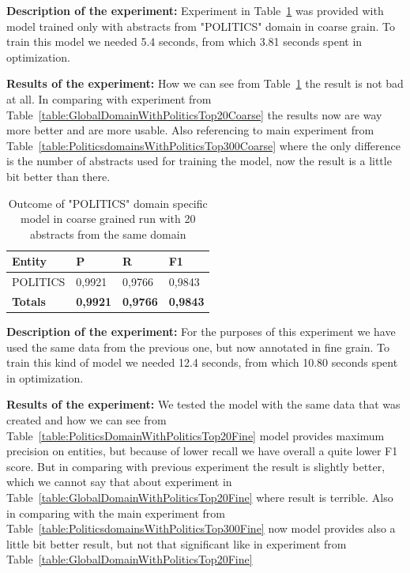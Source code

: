\documentclass[thesis=M,english]{FITthesis}[2018/05/30]
\begin{document}
\textbf{Description of the experiment:} Experiment in Table~\ref{table:PoliticsDomainWithPoliticsTop20Coarse} was provided with model trained only with abstracts from "POLITICS" domain in coarse grain. To train this model we needed 5.4 seconds, from which 3.81 seconds spent in optimization.

\textbf{Results of the experiment:} How we can see from Table~\ref{table:PoliticsDomainWithPoliticsTop20Coarse} the result is not bad at all. In comparing with experiment from Table~\ref{table:GlobalDomainWithPoliticsTop20Coarse} the results now are way more better and are more usable. Also referencing to main experiment from Table~\ref{table:PoliticsdomainsWithPoliticsTop300Coarse} where the only difference is the number of abstracts used for training the model, now the result is a little bit better than there.  
	
	\begin{table}[H]\centering
		\begin{tabular}{|l|l|l|l|}
			\hline {\textbf{Entity}} & {\textbf{P}} & {\textbf{R}} & {\textbf{F1}}\\\hline
				POLITICS & 0,9921 & 0,9766 & 0,9843\\\hline
				\textbf{Totals} & \textbf{0,9921} & \textbf{0,9766} & \textbf{0,9843}\\\hline
		\end{tabular}
		\caption{Outcome of "POLITICS" domain specific model in coarse grained run with 20 abstracts from the same domain \label{table:PoliticsDomainWithPoliticsTop20Coarse}}		
	\end{table}	
	
\textbf{Description of the experiment:} For the purposes of this experiment we have used the same data from the previous one, but now annotated in fine grain. To train this kind of model we needed 12.4 seconds, from which 10.80 seconds spent in optimization.  

\textbf{Results of the experiment:} We tested the model with the same data that was created and how we can see from Table~\ref{table:PoliticsDomainWithPoliticsTop20Fine} model provides maximum precision on entities, but because of lower recall we have overall a quite lower F1 score. But in comparing with previous experiment the result is slightly better, which we cannot say that about experiment in Table~\ref{table:GlobalDomainWithPoliticsTop20Fine} where result is terrible. Also in comparing with the main experiment from Table~\ref{table:PoliticsdomainsWithPoliticsTop300Fine} now model provides also a little bit better result, but not that significant like in experiment from Table~\ref{table:GlobalDomainWithPoliticsTop20Fine} 
	
\end{document}

